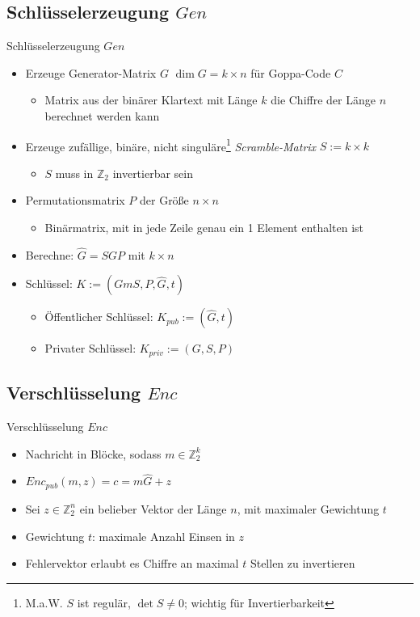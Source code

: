 \documentclass[11pt%
,aspectratio=169%
]{beamer}
\begin{document}
\subsection{Schlüsselerzeugung $Gen$}
\begin{frame}{Schlüsselerzeugung $Gen$}
\begin{itemize}
    \item Erzeuge Generator-Matrix $G$ $\dim{G} = k \times n$ für Goppa-Code $C$
    \begin{itemize}
        \item Matrix aus der binärer Klartext mit Länge $k$ die Chiffre der Länge $n$ berechnet werden kann
    \end{itemize}
    \item Erzeuge zufällige, binäre, nicht singuläre\footnote{M.a.W. $S$ ist regulär, $\det S \neq 0$; wichtig für Invertierbarkeit} \emph{Scramble-Matrix} $S := k \times k$
    \begin{itemize}
        \item $S$ muss in $\mathbb{Z}_2$ invertierbar sein
    \end{itemize}
    \item Permutationsmatrix $P$ der Größe $n \times n$
    \begin{itemize}
        \item Binärmatrix, mit in jede Zeile genau ein 1 Element enthalten ist
    \end{itemize}
    \item Berechne: $\hat{G} = SGP$ mit $k \times n$
    \item Schlüssel: $K := (GmS,P,\hat{G},t)$
    \begin{itemize}
        \item Öffentlicher Schlüssel: $K_{pub}:= (\hat{G}, t)$
        \item Privater Schlüssel: $K_{priv} := (G,S,P)$
    \end{itemize}
\end{itemize}
\end{frame}

\subsection{Verschlüsselung $Enc$}
\begin{frame}{Verschlüsselung $Enc$}
    \begin{itemize}
        \item Nachricht in Blöcke, sodass $m \in \mathbb{Z}_2^k$
        \item $Enc_{pub}(m,z) = c = m\hat{G} + z$
        \item Sei $z \in \mathbb{Z}_2^n$ ein belieber Vektor der Länge $n$, mit maximaler Gewichtung $t$
        \item Gewichtung $t$: maximale Anzahl Einsen in $z$
        \item Fehlervektor erlaubt es Chiffre an maximal $t$ Stellen zu invertieren
    \end{itemize}
\end{frame}
    
\end{document}
